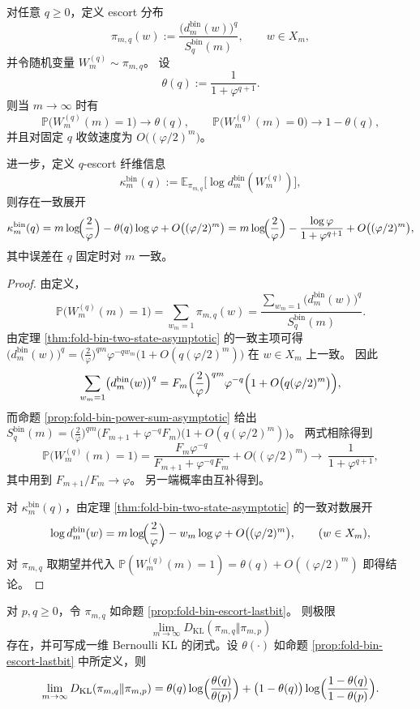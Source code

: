 \begin{proposition}\label{prop:fold-bin-escort-lastbit}
对任意 \(q\ge 0\)，定义 escort 分布
\[
\pi_{m,q}(w):=\frac{\bigl(d^{\mathrm{bin}}_m(w)\bigr)^q}{S_q^{\mathrm{bin}}(m)},\qquad w\in X_m,
\]
并令随机变量 \(W^{(q)}_m\sim\pi_{m,q}\)。
设
\[
\theta(q):=\frac{1}{1+\varphi^{q+1}}.
\]
则当 \(m\to\infty\) 时有
\[
\mathbb{P}\bigl(W^{(q)}_m(m)=1\bigr)\to \theta(q),
\qquad
\mathbb{P}\bigl(W^{(q)}_m(m)=0\bigr)\to 1-\theta(q),
\]
并且对固定 \(q\) 收敛速度为 \(O\bigl((\varphi/2)^m\bigr)\)。

进一步，定义 \(q\)-escort 纤维信息
\[
\kappa^{\mathrm{bin}}_m(q):=\mathbb{E}_{\pi_{m,q}}\bigl[\log d^{\mathrm{bin}}_m(W^{(q)}_m)\bigr],
\]
则存在一致展开
\[
\kappa^{\mathrm{bin}}_m(q)=m\log\!\Bigl(\frac{2}{\varphi}\Bigr)-\theta(q)\log\varphi+O\bigl((\varphi/2)^m\bigr)
=m\log\!\Bigl(\frac{2}{\varphi}\Bigr)-\frac{\log\varphi}{1+\varphi^{q+1}}+O\bigl((\varphi/2)^m\bigr),
\]
其中误差在 \(q\) 固定时对 \(m\) 一致。
\end{proposition}

\begin{proof}
由定义，
\[
\mathbb{P}\bigl(W^{(q)}_m(m)=1\bigr)
=\sum_{w_m=1}\pi_{m,q}(w)
=\frac{\sum_{w_m=1}\bigl(d^{\mathrm{bin}}_m(w)\bigr)^q}{S_q^{\mathrm{bin}}(m)}.
\]
由定理 \ref{thm:fold-bin-two-state-asymptotic} 的一致主项可得
\(
\bigl(d^{\mathrm{bin}}_m(w)\bigr)^q=\bigl(\frac{2}{\varphi}\bigr)^{qm}\varphi^{-qw_m}\bigl(1+O(q(\varphi/2)^m)\bigr)
\)
在 \(w\in X_m\) 上一致。
因此
\[
\sum_{w_m=1}\bigl(d^{\mathrm{bin}}_m(w)\bigr)^q
=F_m\Bigl(\frac{2}{\varphi}\Bigr)^{qm}\varphi^{-q}\Bigl(1+O\bigl(q(\varphi/2)^m\bigr)\Bigr),
\]
而命题 \ref{prop:fold-bin-power-sum-asymptotic} 给出
\(
S_q^{\mathrm{bin}}(m)=\bigl(\frac{2}{\varphi}\bigr)^{qm}\bigl(F_{m+1}+\varphi^{-q}F_m\bigr)\bigl(1+O(q(\varphi/2)^m)\bigr)
\)。
两式相除得到
\[
\mathbb{P}\bigl(W^{(q)}_m(m)=1\bigr)
=\frac{F_m\varphi^{-q}}{F_{m+1}+\varphi^{-q}F_m}+O\bigl((\varphi/2)^m\bigr)
\longrightarrow\ \frac{1}{1+\varphi^{q+1}},
\]
其中用到 \(F_{m+1}/F_m\to\varphi\)。
另一端概率由互补得到。

对 \(\kappa^{\mathrm{bin}}_m(q)\)，由定理 \ref{thm:fold-bin-two-state-asymptotic} 的一致对数展开
\[
\log d^{\mathrm{bin}}_m(w)
=m\log\!\Bigl(\frac{2}{\varphi}\Bigr)-w_m\log\varphi+O\bigl((\varphi/2)^m\bigr),
\qquad (w\in X_m),
\]
对 \(\pi_{m,q}\) 取期望并代入 \(\mathbb{P}(W^{(q)}_m(m)=1)=\theta(q)+O((\varphi/2)^m)\) 即得结论。
\end{proof}

\begin{proposition}\label{prop:fold-bin-escort-escort-kl}
对 \(p,q\ge 0\)，令 \(\pi_{m,q}\) 如命题 \ref{prop:fold-bin-escort-lastbit}。
则极限
\[
\lim_{m\to\infty}D_{\mathrm{KL}}(\pi_{m,q}\Vert \pi_{m,p})
\]
存在，并可写成一维 Bernoulli KL 的闭式。设 \(\theta(\cdot)\) 如命题 \ref{prop:fold-bin-escort-lastbit} 中所定义，则
\[
\lim_{m\to\infty}D_{\mathrm{KL}}(\pi_{m,q}\Vert \pi_{m,p})
=\theta(q)\log\Bigl(\frac{\theta(q)}{\theta(p)}\Bigr)+\bigl(1-\theta(q)\bigr)\log\Bigl(\frac{1-\theta(q)}{1-\theta(p)}\Bigr).
\]
\end{proposition}


